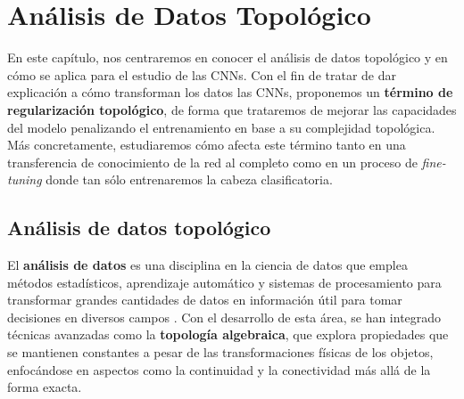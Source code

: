 
\chapter{Análisis de Datos Topológico}
\label{chapter:tda}

En este capítulo, nos centraremos en conocer el análisis de datos topológico y
en cómo se aplica para el estudio de las CNNs. Con el fin de tratar de dar explicación
a cómo transforman los datos las CNNs, proponemos un \textbf{término de
	regularización topológico}, de forma que trataremos de mejorar las capacidades
del modelo penalizando el entrenamiento en base a su complejidad topológica. Más
concretamente, estudiaremos cómo afecta este término tanto en una transferencia
de conocimiento de la red al completo como en un proceso de \textit{fine-tuning}
donde tan sólo entrenaremos la cabeza clasificatoria.

\section{Análisis de datos topológico}

El \textbf{análisis de datos} es una disciplina en la ciencia de datos que emplea
métodos estadísticos, aprendizaje automático y sistemas de procesamiento para
transformar grandes cantidades de datos en información útil para tomar
decisiones en diversos campos \cite{judd2017data}. Con el desarrollo de esta área,
se han integrado técnicas avanzadas como la \textbf{topología algebraica}, que
explora propiedades que se mantienen constantes a pesar de las transformaciones
físicas de los objetos, enfocándose en aspectos como la continuidad y la conectividad
más allá de la forma exacta.

